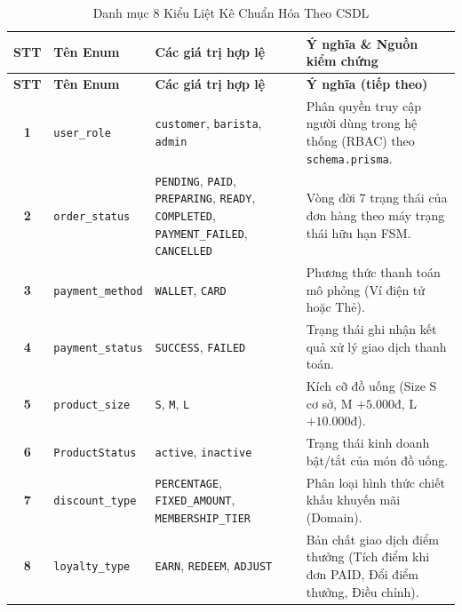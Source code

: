 \documentclass[12pt,a4paper]{article}
\begin{document}
\vspace{0.2cm}
\noindent
\small
\renewcommand{\arraystretch}{1.3}
\begin{xltabular}{\textwidth}{|c|>{\raggedright\arraybackslash}p{3cm}|>{\raggedright\arraybackslash}p{4.2cm}|>{\raggedright\arraybackslash}X|}
\caption{Danh mục 8 Kiểu Liệt Kê Chuẩn Hóa Theo CSDL} \label{tab:enums} \\
\hline
{}
\textbf{STT} & \textbf{Tên Enum} & \textbf{Các giá trị hợp lệ} & \textbf{Ý nghĩa \& Nguồn kiểm chứng} \\
\hline
\endfirsthead

\hline
{}
\textbf{STT} & \textbf{Tên Enum} & \textbf{Các giá trị hợp lệ} & \textbf{Ý nghĩa (tiếp theo)} \\
\hline
\endhead

\hline
\endfoot

\hline
\endlastfoot

\textbf{1} & \texttt{user\_role} & \texttt{customer}, \texttt{barista}, \texttt{admin} & Phân quyền truy cập người dùng trong hệ thống (RBAC) theo \texttt{schema.prisma}. \\
\hline
\textbf{2} & \texttt{order\_status} & \texttt{PENDING}, \texttt{PAID}, \texttt{PREPARING}, \texttt{READY}, \texttt{COMPLETED}, \texttt{PAYMENT\_FAILED}, \texttt{CANCELLED} & Vòng đời 7 trạng thái của đơn hàng theo máy trạng thái hữu hạn FSM. \\
\hline
\textbf{3} & \texttt{payment\_method} & \texttt{WALLET}, \texttt{CARD} & Phương thức thanh toán mô phỏng (Ví điện tử hoặc Thẻ). \\
\hline
\textbf{4} & \texttt{payment\_status} & \texttt{SUCCESS}, \texttt{FAILED} & Trạng thái ghi nhận kết quả xử lý giao dịch thanh toán. \\
\hline
\textbf{5} & \texttt{product\_size} & \texttt{S}, \texttt{M}, \texttt{L} & Kích cỡ đồ uống (Size S cơ sở, M $+5.000$đ, L $+10.000$đ). \\
\hline
\textbf{6} & \texttt{ProductStatus} & \texttt{active}, \texttt{inactive} & Trạng thái kinh doanh bật/tắt của món đồ uống. \\
\hline
\textbf{7} & \texttt{discount\_type} & \texttt{PERCENTAGE}, \texttt{FIXED\_AMOUNT}, \texttt{MEMBERSHIP\_TIER} & Phân loại hình thức chiết khấu khuyến mãi (Domain). \\
\hline
\textbf{8} & \texttt{loyalty\_type} & \texttt{EARN}, \texttt{REDEEM}, \texttt{ADJUST} & Bản chất giao dịch điểm thưởng (Tích điểm khi đơn PAID, Đổi điểm thưởng, Điều chỉnh). \\
\hline
\end{xltabular}
\end{document}
